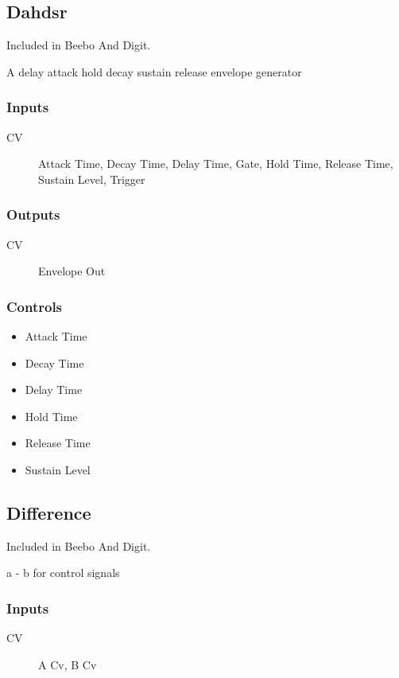 \subsection{Dahdsr}

Included in Beebo And Digit.

A delay attack hold decay sustain release envelope generator



\subsubsection{Inputs}
\begin{description}
\item [CV] Attack Time, Decay Time, Delay Time, Gate, Hold Time, Release Time, Sustain Level, Trigger
\end{description}

\subsubsection{Outputs}
\begin{description}
\item [CV] Envelope Out
\end{description}

\subsubsection{Controls}
\begin{itemize}
\item Attack Time
\item Decay Time
\item Delay Time
\item Hold Time
\item Release Time
\item Sustain Level
\end{itemize}

\subsection{Difference}

Included in Beebo And Digit.

a - b for control signals



\subsubsection{Inputs}
\begin{description}
\item [CV] A Cv, B Cv
\end{description}

